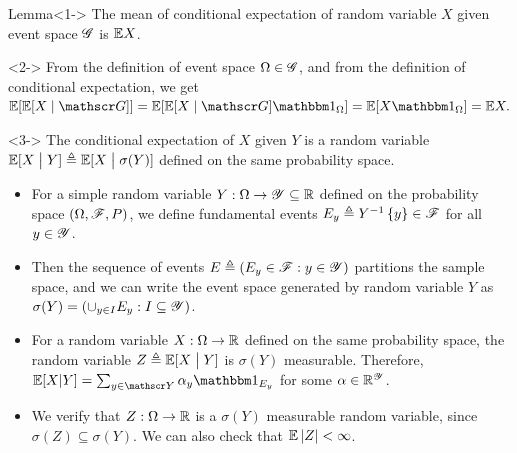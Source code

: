\documentclass[12pt,aspectratio=169]{beamer}
\begin{document}
\begin{frame}
\begin{block}{Lemma}<1->
The mean of conditional expectation of random variable $X$ given event space $\mathscr{G}$ is $\mathbb{E} X$. 
\end{block}
\begin{Proof}<2->
From the definition of event space $\Omega\in\mathscr{G}$, 
and from the definition of conditional expectation, we get 
$
\E[\E[X\mid \sG]] 
= \E[\E[X\mid \sG]\Ind{\Omega}] 
= \E[X\Ind{\Omega}]
= \E X.  
$
\end{Proof}
\begin{Definition}<3->%
The conditional expectation of $X$ given $Y$ is a random variable $\mathbb{E}[X\; \big\vert \; Y] \triangleq \mathbb{E}[X\; \big\vert \;\sigma(Y)]$ defined on the same probability space. 
\end{Definition}
\end{frame}

\begin{frame}
\begin{Example}
\begin{itemize}
\item <1-> For a simple random variable $Y: \Omega \to \mathscr{Y} \subseteq \mathbb{R}$ defined on the probability space $(\Omega, \mathscr{F}, P)$, 
we define fundamental events $E_y \triangleq Y^{-1}\left\{y\right\} \in \mathscr{F}$ for all $y \in \mathscr{Y}$. 
\item <2-> Then the sequence of events $E \triangleq (E_y \in \mathscr{F}: y \in \mathscr{Y})$ partitions the sample space, 
and we can write the event space generated by random variable $Y$ as $\sigma(Y) = (\cup_{y\in I}E_y: I \subseteq \mathscr{Y})$. 

\item <3-> For a random variable $X: \Omega \to \mathbb{R}$ defined on the same probability space, 
the random variable $Z \triangleq \mathbb{E}[X\; \big\vert \; Y]$ is $\sigma(Y)$ measurable. 
Therefore, $\E[X| Y] = \sum_{y\in\sY}\alpha_y\Ind{E_y}$ for some $\alpha\in\mathbb{R}^{\mathscr{Y}}$. 
\item <4-> We verify that $Z:\Omega\to\mathbb{R}$ is a $\sigma(Y)$ measurable random variable, 
since $\sigma(Z) \subseteq \sigma(Y)$. 
We can also check that $\mathbb{E}\left\lvert Z\right\rvert < \infty$.
\end{itemize}
\end{Example}
\end{frame}
\end{document}
